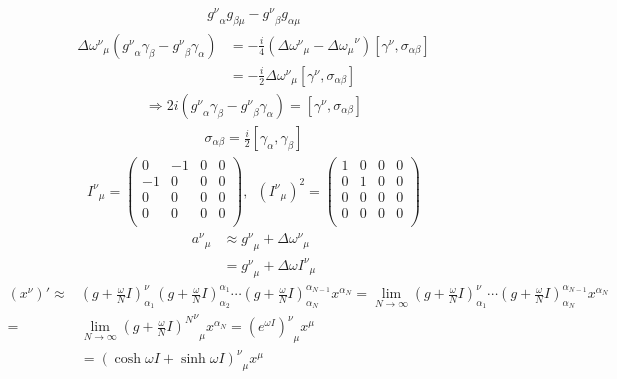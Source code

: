 \documentclass[floatfix,nofootinbib,superscriptaddress,fleqn]{revtex4}
\begin{document}
\begin{align*}
  {g^\nu}_\alpha g_{\beta\mu}-{g^\nu}_\beta g_{\alpha\mu}
\end{align*}
\begin{align*}
  {\Delta\omega^\nu}_\mu\left({g^\nu}_\alpha \gamma_\beta-{g^\nu}_\beta \gamma_\alpha\right)
  &=-\frac{i}{4}\left({\Delta\omega^\nu}_\mu-{\Delta\omega_\mu}^\nu\right)
  \left[\gamma^\nu,\sigma_{\alpha\beta}\right]  \\
  &=-\frac{i}{2}{\Delta\omega^\nu}_\mu\left[\gamma^\nu,\sigma_{\alpha\beta}\right]
\end{align*}
\begin{align*}
  \Longrightarrow 2i\left({g^\nu}_\alpha \gamma_\beta-{g^\nu}_\beta \gamma_\alpha\right)
  =\left[\gamma^\nu,\sigma_{\alpha\beta}\right]
\end{align*}
\begin{align*}
  \sigma_{\alpha\beta}=\frac i2\left[\gamma_\alpha,\gamma_\beta\right]
\end{align*}
\begin{align*}
  {I^\nu}_\mu=
  \begin{pmatrix}
    0&-1&0&0  \\
    -1&0&0&0  \\
    0&0&0&0  \\
    0&0&0&0  \\
  \end{pmatrix},\,\,\,
  \left({I^\nu}_\mu\right)^2=
  \begin{pmatrix}
    1&0&0&0  \\
    0&1&0&0  \\
    0&0&0&0  \\
    0&0&0&0  \\
  \end{pmatrix}
\end{align*}
\begin{align*}
  {a^\nu}_\mu&\approx{g^\nu}_\mu+{\Delta\omega^\nu}_\mu  \\
  &={g^\nu}_\mu+\Delta\omega{I^\nu}_\mu
\end{align*}
\begin{align*}
  \left(x^\nu\right)'\approx& \left(g+\frac{\omega}{N}I\right)^\nu_{\alpha_1}
  \left(g+\frac{\omega}{N}I\right)^{\alpha_1}_{\alpha_2}\cdots
  \left(g+\frac{\omega}{N}I\right)^{\alpha_{N-1}}_{\alpha_N}x^{\alpha_N}  
  =\lim_{N\rightarrow\infty}\left(g+\frac{\omega}{N}I\right)^\nu_{\alpha_1}\cdots
  \left(g+\frac{\omega}{N}I\right)^{\alpha_{N-1}}_{\alpha_N}x^{\alpha_N}  \\
  =&\lim_{N\rightarrow\infty}
  {{\left(g+\frac{\omega}{N}I\right)^{N}}^\nu}_\mu x^{\alpha_N}
  ={\left(e^{\omega I}\right)^\nu}_\mu x^\mu  \\
  &={\left(\cosh\omega I+\sinh \omega I\right)^\nu}_\mu x^\mu
\end{align*}
\end{document}
